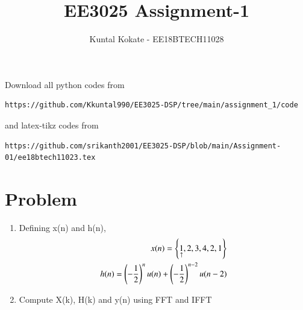 \documentclass[journal,12pt,twocolumn]{IEEEtran}
\renewcommand\thesection{\arabic{section}}
\begin{document}
     \def\rightbox#1{\makebox[0in][r]{#1}}
     \def\centbox#1{\makebox[0in]{#1}}
     \def\topbox#1{\raisebox{-\baselineskip}[0in][0in]{#1}}
     \def\midbox#1{\raisebox{-0.5\baselineskip}[0in][0in]{#1}}
\vspace{3cm}
\title{EE3025 Assignment-1}
\author{Kuntal Kokate - EE18BTECH11028}
\maketitle
\newpage
\bigskip
\renewcommand{\thefigure}{\theenumi}
\renewcommand{\thetable}{\theenumi}
Download all python codes from 
\begin{lstlisting}
https://github.com/Kkuntal990/EE3025-DSP/tree/main/assignment_1/code
\end{lstlisting}
%
and latex-tikz codes from 
%
\begin{lstlisting}
https://github.com/srikanth2001/EE3025-DSP/blob/main/Assignment-01/ee18btech11023.tex
\end{lstlisting}

\section{Problem}
\begin{enumerate}[label=\thesection.\arabic*.,ref=\thesection.\theenumi]
    
    \item Defining x(n) and h(n),
    \begin{align}
        x(n) = \left\{\underset{\uparrow}{1},2,3,4,2,1\right\} \\
        h(n)=\left(-\frac{1}{2}\right)^{n} u(n)+\left(-\frac{1}{2}\right)^{n-2} u(n-2)
    \end{align}
    
    \item Compute X(k), H(k) and y(n) using FFT and IFFT 

\end{enumerate}
\end{document}
